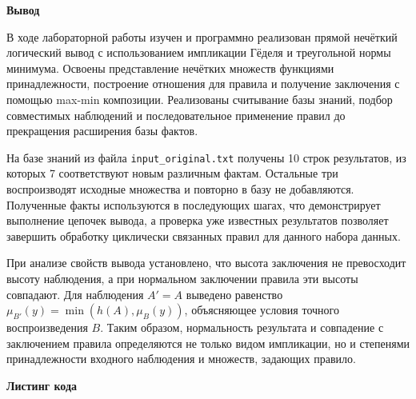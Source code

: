 \documentclass[14pt,a4paper]{extarticle}
\newcommand{\reportheading}[1]{\par\vspace{0.8\baselineskip}\noindent\textbf{#1}\par\nobreak\vspace{0.35\baselineskip}\nobreak}
\begin{document}
\reportheading{Вывод}
В ходе лабораторной работы изучен и программно реализован прямой нечёткий логический вывод с использованием импликации Гёделя и треугольной нормы минимума. Освоены представление нечётких множеств функциями принадлежности, построение отношения для правила и получение заключения с помощью max-min композиции. Реализованы считывание базы знаний, подбор совместимых наблюдений и последовательное применение правил до прекращения расширения базы фактов.

На базе знаний из файла \texttt{input\_original.txt} получены 10 строк результатов, из которых 7 соответствуют новым различным фактам. Остальные три воспроизводят исходные множества и повторно в базу не добавляются. Полученные факты используются в последующих шагах, что демонстрирует выполнение цепочек вывода, а проверка уже известных результатов позволяет завершить обработку циклически связанных правил для данного набора данных.

При анализе свойств вывода установлено, что высота заключения не превосходит высоту наблюдения, а при нормальном заключении правила эти высоты совпадают. Для наблюдения $A'=A$ выведено равенство $\mu_{B'}(y)=\min(h(A),\mu_B(y))$, объясняющее условия точного воспроизведения $B$. Таким образом, нормальность результата и совпадение с заключением правила определяются не только видом импликации, но и степенями принадлежности входного наблюдения и множеств, задающих правило.

\clearpage

\reportheading{Листинг кода}
\end{document}
